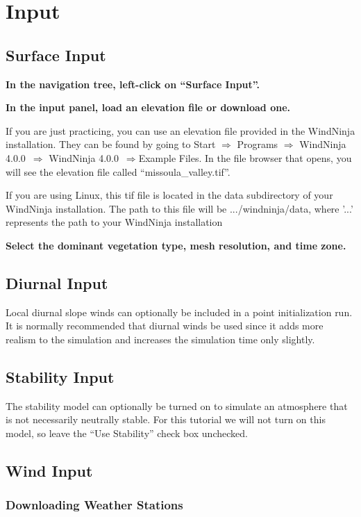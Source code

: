 \documentclass[12pt]{article}
\newcommand\vn{4.0.0}
\begin{document}
\section{Input}
\subsection{Surface Input}

\textbf{\color{red}In the navigation tree, left-click on “Surface Input”.}

\textbf{\color{red}In the input panel, load an elevation file or download one.}

If you are just practicing, you can use an elevation file provided in the WindNinja installation.  
They can be found by going to Start $\Rightarrow$ Programs $\Rightarrow$ WindNinja \vn\ $\Rightarrow$ WindNinja \vn\ $\Rightarrow$Example Files.  
In the file browser that opens, you will see the elevation file called “missoula\_valley.tif”.

If you are using Linux, this tif file is located in the data subdirectory of your WindNinja installation. 
The path to this file will be .../windninja/data, where '...' represents the path to your WindNinja installation

\textbf{\color{red}Select the dominant vegetation type, mesh resolution, and time zone.}

\subsection{Diurnal Input}
Local diurnal slope winds can optionally be included in a point initialization run.  
It is normally recommended that diurnal winds be used since it adds more realism to the simulation and increases the simulation time only slightly.

\subsection{Stability Input}

The stability model can optionally be turned on to simulate an atmosphere that is not necessarily neutrally stable.  
For this tutorial we will not turn on this model, so leave the “Use Stability” check box unchecked.

\subsection{Wind Input}
\subsubsection{Downloading Weather Stations}
\end{document}
